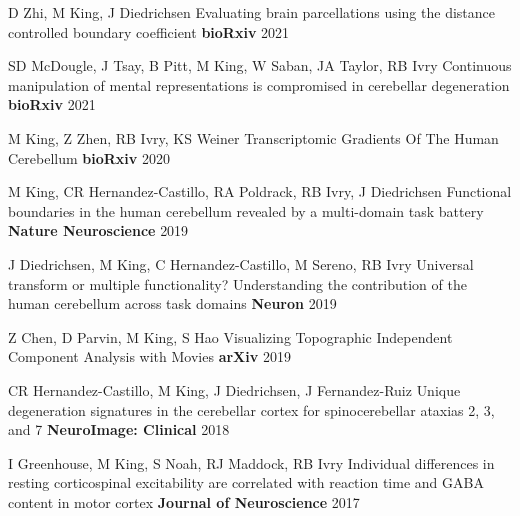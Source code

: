 \begin{cventries}

  \cventry
    {D Zhi, M King, J Diedrichsen} %
    {Evaluating brain parcellations using the distance controlled boundary coefficient} %
    {\textbf{bioRxiv}} %
    {2021} %
    {}

  \cventry
    {SD McDougle, J Tsay, B Pitt, M King, W Saban, JA Taylor, RB Ivry} %
    {Continuous manipulation of mental representations is compromised in cerebellar degeneration} %
    {\textbf{bioRxiv}} %
    {2021} %
    {}
    
  \cventry
    {M King, Z Zhen, RB Ivry, KS Weiner} %
    {Transcriptomic Gradients Of The Human Cerebellum} %
    {\textbf{bioRxiv}} %
    {2020} %
    {}
    
  \cventry
    {M King, CR Hernandez-Castillo, RA Poldrack, RB Ivry, J Diedrichsen} %
    {Functional boundaries in the human cerebellum revealed by a multi-domain task battery} %
    {\textbf{Nature Neuroscience}} %
    {2019} %
    {}
    
  \cventry
    {J Diedrichsen, M King, C Hernandez-Castillo, M Sereno, RB Ivry} %
    {Universal transform or multiple functionality? Understanding the contribution of the human cerebellum across task domains} %
    {\textbf{Neuron}} %
    {2019} %
    {}
    
  \cventry
    {Z Chen, D Parvin, M King, S Hao} %
    {Visualizing Topographic Independent Component Analysis with Movies} %
    {\textbf{arXiv}} %
    {2019} %
    {}
    
  \cventry
    {CR Hernandez-Castillo, M King, J Diedrichsen, J Fernandez-Ruiz} %
    {Unique degeneration signatures in the cerebellar cortex for spinocerebellar ataxias 2, 3, and 7} %
    {\textbf{NeuroImage: Clinical}} %
    {2018} %
    {}
    
  \cventry
    {I Greenhouse, M King, S Noah, RJ Maddock, RB Ivry} %
    {Individual differences in resting corticospinal excitability are correlated with reaction time and GABA content in motor cortex} %
    {\textbf{Journal of Neuroscience}} %
    {2017} %
    {}
    

\end{cventries}
